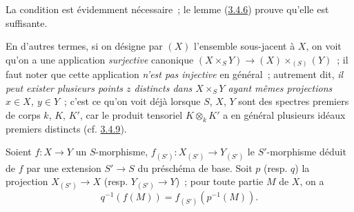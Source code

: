 La condition est évidemment nécessaire~; le lemme
(\hyperref[I.3.4.6-fr]{3.4.6}) prouve qu'elle est suffisante.

\label{I.3.4.7.underlying-map-fr}
En d'autres termes, si on désigne par $(X)$ l'ensemble sous-jacent à $X$, on
voit qu'on a une application \emph{surjective} canonique
$(X\times_S Y)\to (X)\times_{(S)}(Y)$~; il faut noter que cette application
\emph{n'est pas injective} en général~; autrement dit, \emph{il peut exister
plusieurs points $z$ distincts dans $X\times_S Y$ ayant mêmes projections
$x\in X$, $y\in Y$}~; c'est ce qu'on voit déjà lorsque $S$, $X$, $Y$ sont des
spectres premiers de corps $k$, $K$, $K'$, car le produit tensoriel
$K\otimes_k K'$ a en général plusieurs idéaux premiers distincts
(cf. \hyperref[I.3.4.9-fr]{3.4.9}).

\begin{corollary}[3.4.8]
\label{I.3.4.8-fr}
Soient $f:X\to Y$ un $S$-morphisme, $f_{(S')}:X_{(S')}\to Y_{(S')}$ le
$S'$-morphisme déduit de $f$ par une extension $S'\to S$ du préschéma de base.
Soit $p$ (resp. $q$) la projection $X_{(S')}\to X$ (resp.
$Y_{(S')}\to Y$)~; pour toute partie $M$ de $X$, on a
\label{I.3.4.8.base-change-image-fr}
\[
  q^{-1}(f(M))=f_{(S')}(p^{-1}(M)).
\]
\end{corollary}

